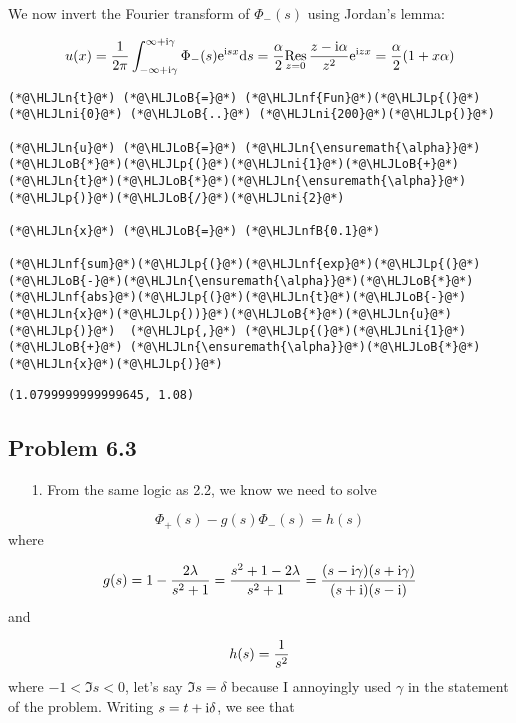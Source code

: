 \documentclass[12pt,a4paper]{article}
\newcommand{\HLJLn}[1]{#1}
\newcommand{\HLJLnf}[1]{\textcolor[RGB]{66,102,213}{#1}}
\newcommand{\HLJLnfB}[1]{\textcolor[RGB]{59,151,46}{#1}}
\newcommand{\HLJLni}[1]{\textcolor[RGB]{59,151,46}{#1}}
\newcommand{\HLJLoB}[1]{\textcolor[RGB]{102,102,102}{\textbf{#1}}}
\newcommand{\HLJLp}[1]{#1}
\def\D{ {\rm d} }
\def\I{ {\rm i} }
\def\E{ {\rm e} }
\def\Res_#1{\underset{#1}{\rm Res}\,}
\begin{document}
We now invert the Fourier transform of $\Phi_-(s)$ using Jordan's lemma:

\[
u(x) = {1 \over 2 \pi} \int_{-\infty + \I \gamma}^{\infty + \I \gamma} \Phi_-(s) \E^{\I s x} \D s = {\alpha \over 2}\Res_{z = 0} {z- \I \alpha \over z^2} \E^{\I z x}  = {\alpha \over 2} (1+x \alpha)
\]

\begin{lstlisting}
(*@\HLJLn{t}@*) (*@\HLJLoB{=}@*) (*@\HLJLnf{Fun}@*)(*@\HLJLp{(}@*)(*@\HLJLni{0}@*) (*@\HLJLoB{..}@*) (*@\HLJLni{200}@*)(*@\HLJLp{)}@*)

(*@\HLJLn{u}@*) (*@\HLJLoB{=}@*) (*@\HLJLn{\ensuremath{\alpha}}@*)(*@\HLJLoB{*}@*)(*@\HLJLp{(}@*)(*@\HLJLni{1}@*)(*@\HLJLoB{+}@*)(*@\HLJLn{t}@*)(*@\HLJLoB{*}@*)(*@\HLJLn{\ensuremath{\alpha}}@*)(*@\HLJLp{)}@*)(*@\HLJLoB{/}@*)(*@\HLJLni{2}@*)

(*@\HLJLn{x}@*) (*@\HLJLoB{=}@*) (*@\HLJLnfB{0.1}@*)

(*@\HLJLnf{sum}@*)(*@\HLJLp{(}@*)(*@\HLJLnf{exp}@*)(*@\HLJLp{(}@*)(*@\HLJLoB{-}@*)(*@\HLJLn{\ensuremath{\alpha}}@*)(*@\HLJLoB{*}@*)(*@\HLJLnf{abs}@*)(*@\HLJLp{(}@*)(*@\HLJLn{t}@*)(*@\HLJLoB{-}@*)(*@\HLJLn{x}@*)(*@\HLJLp{))}@*)(*@\HLJLoB{*}@*)(*@\HLJLn{u}@*)(*@\HLJLp{)}@*)  (*@\HLJLp{,}@*) (*@\HLJLp{(}@*)(*@\HLJLni{1}@*) (*@\HLJLoB{+}@*) (*@\HLJLn{\ensuremath{\alpha}}@*)(*@\HLJLoB{*}@*)(*@\HLJLn{x}@*)(*@\HLJLp{)}@*)
\end{lstlisting}

\begin{lstlisting}
(1.0799999999999645, 1.08)
\end{lstlisting}


\subsection{Problem 6.3}
\begin{itemize}
\item[1. ] From the same logic as 2.2, we know we need to solve

\end{itemize}
\[
\Phi_+(s) - g(s) \Phi_-(s) = h(s)
\]
where

\[
g(s) = 1 - {2 \lambda \over s^2 + 1} = {s^2 +1-2 \lambda \over s^2 + 1} = {(s- \I\gamma)(s+\I \gamma) \over (s+\I)(s-\I)}
\]
and

\[
h(s) = {1 \over s^2}
\]
where $-1 < \Im s  < 0$, let's say $\Im s  = \delta$ because I annoyingly used $\gamma$ in the statement of the problem. Writing $s = t + \I \delta$, we see that
\end{document}
